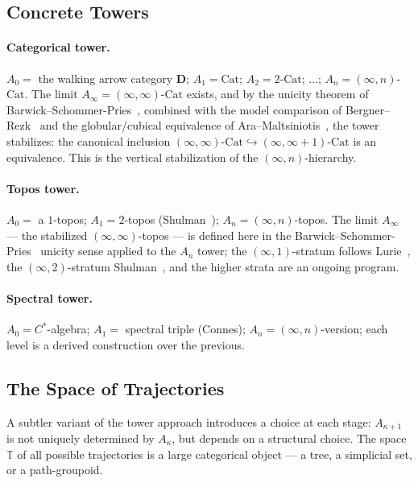 \documentclass[11pt]{article}
\theoremstyle{plain}
\theoremstyle{definition}
\newcommand{\Cat}{\mathrm{Cat}}
\begin{document}
\subsection{Concrete Towers}

\paragraph{Categorical tower.} $A_0 = $ the walking arrow category $\mathbf{D}$; $A_1 = \Cat$; $A_2 = 2\text{-}\Cat$; $\ldots$; $A_n = (\infty, n)$-$\Cat$. The limit $A_\infty = (\infty, \infty)$-$\Cat$ exists, and by the unicity theorem of Barwick--Schommer-Pries~\cite{BarwickSchommerPries2021}, combined with the model comparison of Bergner--Rezk~\cite{BergnerRezk2013} and the globular/cubical equivalence of Ara--Maltsiniotis~\cite{AraMaltsiniotis2017}, the tower stabilizes: the canonical inclusion $(\infty, \infty)\text{-}\Cat \hookrightarrow (\infty, \infty+1)\text{-}\Cat$ is an equivalence. This is the vertical stabilization of the $(\infty, n)$-hierarchy.

\paragraph{Topos tower.} $A_0 = $ a $1$-topos; $A_1 = 2$-topos (Shulman~\cite{Shulman2008}); $A_n = (\infty, n)$-topos. The limit $A_\infty$ — the stabilized $(\infty, \infty)$-topos — is defined here in the Barwick--Schommer-Pries~\cite{BarwickSchommerPries2021} unicity sense applied to the $A_n$ tower; the $(\infty, 1)$-stratum follows Lurie~\cite{LurieHTT}, the $(\infty, 2)$-stratum Shulman~\cite{Shulman2008}, and the higher strata are an ongoing program.

\paragraph{Spectral tower.} $A_0 = C^*$-algebra; $A_1 = $ spectral triple (Connes); $A_n = (\infty, n)$-version; each level is a derived construction over the previous.

\subsection{The Space of Trajectories}

A subtler variant of the tower approach introduces a choice at each stage: $A_{\kappa+1}$ is not uniquely determined by $A_\kappa$, but depends on a structural choice. The space $\mathbb{T}$ of all possible trajectories is a large categorical object --- a tree, a simplicial set, or a path-groupoid.
\end{document}

